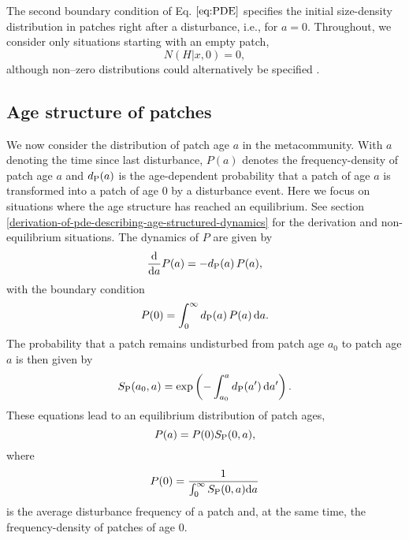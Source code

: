 \documentclass[10pt,twoside]{article}
\begin{document}
The second boundary condition of Eq. \(\ref{eq:PDE}\) specifies the initial size-density
distribution in patches right after a disturbance, i.e., for \(a = 0\). Throughout, we consider only
situations starting with an empty patch,
\begin{equation} \label{eq:BC2} N\left(H|x,0\right) = 0,
\end{equation}
although non--zero distributions could alternatively be specified
\citep[e.g.,][]{Kohyama-1993, Moorcroft-2001}.

\subsection{Age structure of
patches}\label{age-structured-distribution-of-patches}

We now consider the distribution of patch age \(a\) in the metacommunity.
With \(a\) denoting the time since last disturbance, \(P(a)\) denotes the
frequency-density of patch age \(a\) and \(d_{\rm P}(a)\) is the
age-dependent probability that a patch of age \(a\) is transformed into
a patch of age 0 by a disturbance event. Here we focus on situations
where the age structure has reached an equilibrium. See section
\ref{derivation-of-pde-describing-age-structured-dynamics} for the derivation and
non-equilibrium situations. The dynamics of \(P\) are given by
\citep{Mckendrick-1926, Vonfoerster-1959}
\begin{equation} \label{eq:agepde}
\frac{{\rm d}}{{\rm d} a} P(a) = - d_{\rm P}(a) \, P(a) ,
\end{equation}
with the boundary condition
\begin{equation} P(0) = \int_0^\infty d_{\rm P}(a) \, P(a) \, {\rm d} a.
\end{equation}
The probability that a patch remains undisturbed from patch age \(a_0\) to patch age \(a\) is
then given by
\begin{equation} \label{eq:survivalPatch}
S_{\rm P} (a_0, a) = \exp\left( - \int_{a_0}^{a} d_{\rm P}(a^\prime) \, {\rm d} a^\prime \right).
\end{equation}
These equations lead to an equilibrium distribution of patch ages,
\begin{equation} P(a) = P(0) S_{\rm P} (0, a),
\end{equation}
where
\begin{equation}
P(0) = \frac1{\int_0^\infty S_{\rm P} (0, a) {\rm d}a}
\end{equation}
is the average disturbance frequency of a patch and, at the same time, the frequency-density of patches of
age \(0\).
\end{document}
